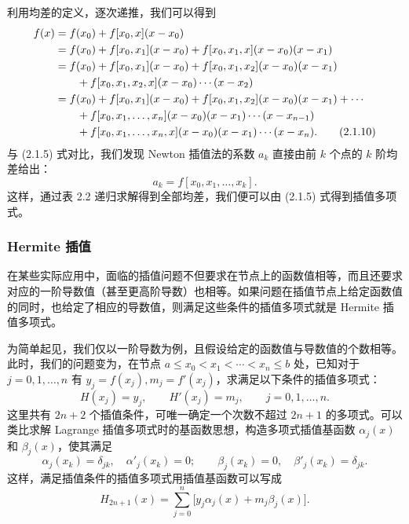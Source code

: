 利用均差的定义，逐次递推，我们可以得到
\begin{align}
 f(x)&=f(x_0)+f[x_0,x](x-x_0)\notag\\
 &=f(x_0)+f[x_0,x_1](x-x_0)+f[x_0,x_1,x](x-x_0)(x-x_1)\notag\\
 &=f(x_0)+f[x_0,x_1](x-x_0)+f[x_0,x_1,x_2](x-x_0)(x-x_1)\notag\\
 &\qquad +f[x_0,x_1,x_2,x](x-x_0)\cdots(x-x_2)\notag\\
 &=f(x_0)+f[x_0,x_1](x-x_0)+f[x_0,x_1,x_2](x-x_0)(x-x_1)+\cdots\notag\\
 &\qquad +f[x_0,x_1,\ldots,x_n](x-x_0)(x-x_1)\cdots(x-x_{n-1})\notag\\
 &\qquad +f[x_0,x_1,\ldots,x_n,x](x-x_0)(x-x_1)\cdots(x-x_n).
\tag{2.1.10}
\end{align}
与 (2.1.5) 式对比，我们发现 Newton 插值法的系数 $a_k$ 直接由前 $k$ 个点的 $k$ 阶均差给出：
\begin{equation}
 a_k=f[x_0,x_1,\ldots,x_k].
\tag{2.1.11}
\end{equation}
这样，通过表 2.2 递归求解得到全部均差，我们便可以由 (2.1.5) 式得到插值多项式。

\subsubsection{Hermite 插值}

在某些实际应用中，面临的插值问题不但要求在节点上的函数值相等，而且还要求对应的一阶导数值（甚至更高阶导数）也相等。如果问题在插值节点上给定函数值的同时，也给定了相应的导数值，则满足这些条件的插值多项式就是 Hermite 插值多项式。

为简单起见，我们仅以一阶导数为例，且假设给定的函数值与导数值的个数相等。此时，我们的问题变为，在节点 $a\le x_0<x_1<\cdots<x_n\le b$ 处，已知对于 $j=0,1,\ldots,n$ 有 $y_j=f(x_j),m_j=f'(x_j)$，求满足以下条件的插值多项式：
\begin{equation}
 H(x_j)=y_j,\qquad H'(x_j)=m_j,\qquad j=0,1,\ldots,n.
\tag{2.1.12}
\end{equation}
这里共有 $2n+2$ 个插值条件，可唯一确定一个次数不超过 $2n+1$ 的多项式。可以类比求解 Lagrange 插值多项式时的基函数思想，构造多项式插值基函数 $\alpha_j(x)$ 和 $\beta_j(x)$，使其满足
\begin{equation}
 \alpha_j(x_k)=\delta_{jk},\quad \alpha'_j(x_k)=0;\qquad
 \beta_j(x_k)=0,\quad \beta'_j(x_k)=\delta_{jk}.
\tag{2.1.13}
\end{equation}
这样，满足插值条件的插值多项式用插值基函数可以写成
\begin{equation}
 H_{2n+1}(x)=\sum_{j=0}^{n}\bigl[y_j\alpha_j(x)+m_j\beta_j(x)\bigr].
\tag{2.1.14}
\end{equation}

